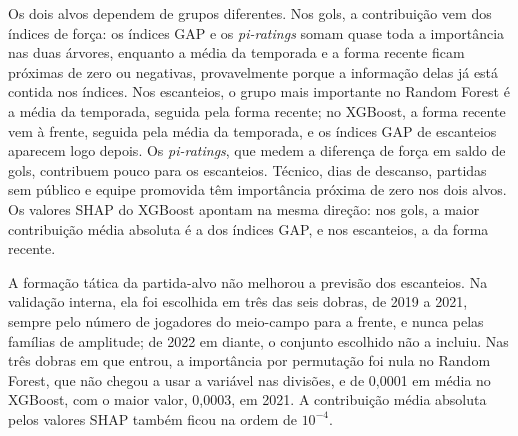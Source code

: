 Os dois alvos dependem de grupos diferentes. Nos gols, a contribuição vem dos índices de força: os índices GAP e os \textit{pi-ratings} somam quase toda a importância nas duas árvores, enquanto a média da temporada e a forma recente ficam próximas de zero ou negativas, provavelmente porque a informação delas já está contida nos índices. Nos escanteios, o grupo mais importante no Random Forest é a média da temporada, seguida pela forma recente; no XGBoost, a forma recente vem à frente, seguida pela média da temporada, e os índices GAP de escanteios aparecem logo depois. Os \textit{pi-ratings}, que medem a diferença de força em saldo de gols, contribuem pouco para os escanteios. Técnico, dias de descanso, partidas sem público e equipe promovida têm importância próxima de zero nos dois alvos. Os valores SHAP do XGBoost apontam na mesma direção: nos gols, a maior contribuição média absoluta é a dos índices GAP, e nos escanteios, a da forma recente.

A formação tática da partida-alvo não melhorou a previsão dos escanteios. Na validação interna, ela foi escolhida em três das seis dobras, de 2019 a 2021, sempre pelo número de jogadores do meio-campo para a frente, e nunca pelas famílias de amplitude; de 2022 em diante, o conjunto escolhido não a incluiu. Nas três dobras em que entrou, a importância por permutação foi nula no Random Forest, que não chegou a usar a variável nas divisões, e de 0,0001 em média no XGBoost, com o maior valor, 0,0003, em 2021. A contribuição média absoluta pelos valores SHAP também ficou na ordem de $10^{-4}$.
